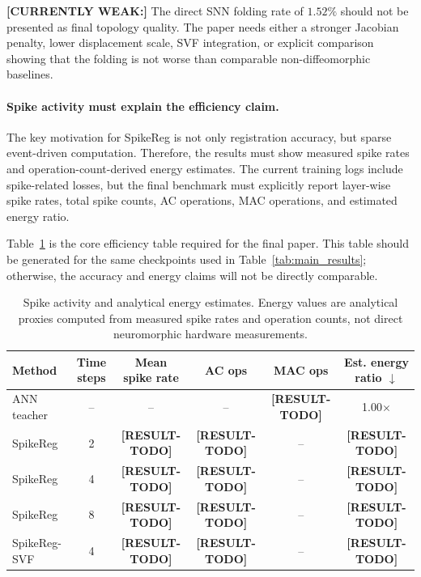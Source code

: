 \textbf{[CURRENTLY WEAK:]} The direct SNN folding rate of $1.52\%$ should not be presented as final topology quality. The paper needs either a stronger Jacobian penalty, lower displacement scale, SVF integration, or explicit comparison showing that the folding is not worse than comparable non-diffeomorphic baselines.


\paragraph{Spike activity must explain the efficiency claim.}
The key motivation for SpikeReg is not only registration accuracy, but sparse event-driven computation. Therefore, the results must show measured spike rates and operation-count-derived energy estimates. The current training logs include spike-related losses, but the final benchmark must explicitly report layer-wise spike rates, total spike counts, AC operations, MAC operations, and estimated energy ratio.

Table~\ref{tab:energy} is the core efficiency table required for the final paper. This table should be generated for the same checkpoints used in Table~\ref{tab:main_results}; otherwise, the accuracy and energy claims will not be directly comparable.

\begin{table}[t]
\centering
\caption{
Spike activity and analytical energy estimates. 
Energy values are analytical proxies computed from measured spike rates and operation counts, not direct neuromorphic hardware measurements.
}
\label{tab:energy}
\begin{tabular}{lccccc}
\hline
Method & Time steps & Mean spike rate & AC ops & MAC ops & Est. energy ratio $\downarrow$ \\
\hline
ANN teacher & -- & -- & -- & \textbf{[RESULT-TODO]} & 1.00$\times$ \\
SpikeReg & 2 & \textbf{[RESULT-TODO]} & \textbf{[RESULT-TODO]} & -- & \textbf{[RESULT-TODO]} \\
SpikeReg & 4 & \textbf{[RESULT-TODO]} & \textbf{[RESULT-TODO]} & -- & \textbf{[RESULT-TODO]} \\
SpikeReg & 8 & \textbf{[RESULT-TODO]} & \textbf{[RESULT-TODO]} & -- & \textbf{[RESULT-TODO]} \\
SpikeReg-SVF & 4 & \textbf{[RESULT-TODO]} & \textbf{[RESULT-TODO]} & -- & \textbf{[RESULT-TODO]} \\
\hline
\end{tabular}
\end{table}

